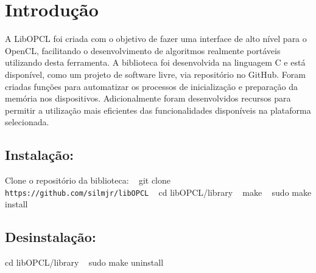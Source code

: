 \section{Introdução}\label{index_Introdução}
A Lib\+O\+P\+CL foi criada com o objetivo de fazer uma interface de alto nível para o Open\+CL, facilitando o desenvolvimento de algoritmos realmente portáveis utilizando desta ferramenta. A biblioteca foi desenvolvida na linguagem C e está disponível, como um projeto de software livre, via repositório no Git\+Hub. Foram criadas funções para automatizar os processos de inicialização e preparação da memória nos dispositivos. Adicionalmente foram desenvolvidos recursos para permitir a utilização mais eficientes das funcionalidades disponíveis na plataforma selecionada. \subsection{Instalação\+:}\label{index_Install}
Clone o repositório da biblioteca\+: ~\newline
 git clone {\tt https\+://github.\+com/silmjr/lib\+O\+P\+CL} ~\newline
 cd lib\+O\+P\+C\+L/library ~\newline
 make ~\newline
 sudo make install \subsection{Desinstalação\+:}\label{index_uninstall}
cd lib\+O\+P\+C\+L/library ~\newline
 sudo make uninstall 